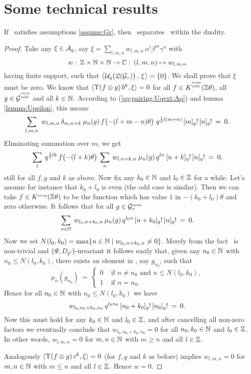 
\chapter{Some technical results}
\label{app:technical}


\begin{lemma_chp} \label{lemma:UqTG_separates_Aq}
 If\/ \Gtau\ satisfies assumptions \ref{assume:Gr}, then\/ \UqTG\ separates\/ \Aq\
 within the duality.
\end{lemma_chp}
\begin{proof}
  Take any $\xi \in {\mathcal A}_q$, say $\xi = \sum_{l,m,n} w_{l,m,n}\, \alpha^l \beta^m \gamma^n$
  with
  $$ w :\, \mathbb{Z} \times \mathbb{N} \times \mathbb{N} \rightarrow \mathbb{C} : \,(l,m,n) \mapsto w_{l,m,n}$$
  having finite support, such that $\pairM{\UqTG}{\xi} = \{0\}$.
  We shall prove that $\xi$ must be zero. We know that
  $\langle \Upsilon(f \otimes g)\, b^k,\xi \rangle = 0$
  for all $f\in K^{\stackrel{\scriptscriptstyle \rm even}{\scriptscriptstyle \! \rm odd}}(\mathbb{Z} \theta)$, all $g\in \mathcal G^{\stackrel{\scriptscriptstyle \rm even}{\scriptscriptstyle \! \rm odd}}$ and all $k\in \mathbb{N}$.
  According to (\ref{eq:pairing:Uqext:Aq}) and lemma
  \ref{lemma:Upsilon}, this means
  $$  \sum_{l,m,n} \; w_{l,m,n}\, \delta_{m,n+k} \:\mu_n(g)\,
         f \!\left(-(l+m-n)\theta\vertM\right) \,
         q^{\frac{1}{2}l(m+n)} \,\qfac{m}\, \qfac{n} \:=\: 0. $$
  Eliminating summation over $m$, we get
  $$  \sum_{l} \: q^{\frac{1}{2}l k}\, f \!\left(-(l+k)\theta\vertM\right) \:
      \sum_{n} \: w_{l,n+k,n}\: \mu_n(g)\,
          q^{l n} \,\qfac{n+k}\, \qfac{n}\: =\: 0, $$
  still for all $f,g$ and $k$ as above. Now fix any $k_0\in\mathbb{N}$ and
  $l_0 \in \mathbb{Z}$ for a while. Let's assume for instance that $k_0 + l_0$ is even
  (the odd case is similar). Then we can take $f\in K^{\rm \scriptscriptstyle even}(\mathbb{Z} \theta)$ to be the
  function which has value $1$ in $-(k_0 + l_0) \theta$ and
  zero otherwise. It follows that for all $g\in \mathcal G_\tau^{\rm \scriptscriptstyle even}$
  $$ \sum_{n \in \mathbb{N}}\: w_{l_0,n+k_0,n}\, \mu_n(g)\,
           q^{l_0 n} \,[n+k_0]_q!\, [n]_q! \:= \: 0. $$
  Now we set $N(l_0, k_0) = \max
                 \{ n \in \mathbb{N}  \mid  w_{l_0,n+k_0,n} \neq 0 \}.$
  Merely from the fact \Geven\ is non-trivial and
  $\{\Psi,D_{q^2}\}$-invariant it follows easily that,
  given any $n_0 \in \mathbb{N}$ with $n_0 \leq N(l_0, k_0)$, there exists an
  element in \Geven, say $g_{n_0}$, such that
  $$  \mu_n\left(g_{n_0}\right)\:=\: \left\{ \!
          \begin{array}{ll}
                0 & \mbox{ if $n\neq n_0$ and $n\leq N(l_0, k_0)$}, \\
                1 & \mbox{ if $n=n_0$}.
          \end{array} \right. $$
  Hence for all  $n_0 \in \mathbb{N}$ with $n_0 \leq N(l_0, k_0)$ we have
  $$w_{l_0,n_0+k_0,n_0}\, q^{l_0 n_0} \,[n_0+k_0]_q!\, [n_0]_q! \:=\: 0. $$
  Now this must hold for any $k_0\in\mathbb{N}$ and $l_0 \in \mathbb{Z}$,
  and after cancelling all non-zero factors we eventually conclude that
  $w_{l_0,n_0+k_0,n_0} = 0$ for all $n_0,k_0\in\mathbb{N}$
  and $l_0 \in \mathbb{Z}$. In other words, $w_{l,m,n} = 0$
  for $m,n\in\mathbb{N}$ with $m\geq n$ and all $l \in \mathbb{Z}$.

  Analogously $\langle \Upsilon(f \otimes g)\, c^k,\xi \rangle = 0$
  (for $f,g$ and $k$ as before)
  implies $w_{l,m,n} = 0$ for $m,n\in\mathbb{N}$ with $m\leq n$ and all $l \in
  \mathbb{Z}$. Hence $w=0$.
\end{proof}




